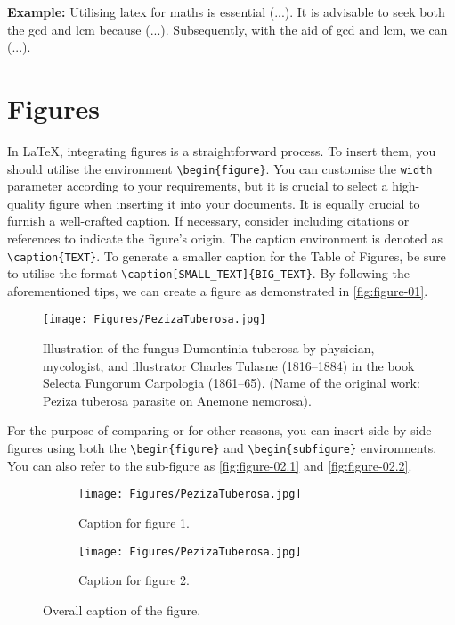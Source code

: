 {	\vspace{.875em}
	\textbf{Example:} Utilising \Gls{latex} for \Gls{maths} is essential (...). It is advisable to seek both the \acrfull{gcd} and \acrfull{lcm} because (...). Subsequently, with the aid of \acrshort{gcd} and \acrshort{lcm}, we can (...).

	\section{Figures}
	In \LaTeX, integrating figures is a straightforward process. To insert them, you should utilise the environment \verb|\begin{figure}|. You can customise the \verb|width| parameter according to your requirements, but it is crucial to select a high-quality figure when inserting it into your documents. It is equally crucial to furnish a well-crafted caption. If necessary, consider including citations or references to indicate the figure's origin. The caption environment is denoted as \verb|\caption{TEXT}|. To generate a smaller caption for the Table of Figures, be sure to utilise the format \verb|\caption[SMALL_TEXT]{BIG_TEXT}|. By following the aforementioned tips, we can create a figure as demonstrated in \autoref{fig:figure-01}.

	\begin{figure}[!htpb]
		\centering
		\texttt{[image: Figures/PezizaTuberosa.jpg]}
		\caption[Illustration of the fungus Dumontinia tuberosa.]{Illustration of the fungus Dumontinia tuberosa by physician, mycologist, and illustrator Charles Tulasne (1816–1884) in the book Selecta Fungorum Carpologia (1861–65). (Name of the original work: Peziza tuberosa parasite on Anemone nemorosa).}
		\label{fig:figure-01}
	\end{figure}

	For the purpose of comparing or for other reasons, you can insert side-by-side figures using both the \verb|\begin{figure}| and \verb|\begin{subfigure}| environments. You can also refer to the sub-figure as \autoref{fig:figure-02.1} and \autoref{fig:figure-02.2}.

	\begin{figure}[!htpb]
		\centering
		\begin{subfigure}{0.45\textwidth}
			\centering
			\texttt{[image: Figures/PezizaTuberosa.jpg]}
			\caption{Caption for figure 1.}
			\label{fig:figure-02.1}
		\end{subfigure}
		\hspace{.5cm} %
		\begin{subfigure}{0.45\textwidth}
			\centering
			\texttt{[image: Figures/PezizaTuberosa.jpg]}
			\caption{Caption for figure 2.}
			\label{fig:figure-02.2}
		\end{subfigure}
		\caption{Overall caption of the figure.}
		\label{fig:figure-02}
	\end{figure}

}

